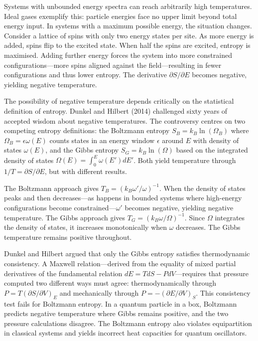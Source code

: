 Systems with unbounded energy spectra can reach arbitrarily high temperatures. Ideal gases exemplify this: particle energies face no upper limit beyond total energy input. In systems with a maximum possible energy, the situation changes. Consider a lattice of spins with only two energy states per site. As more energy is added, spins flip to the excited state. When half the spins are excited, entropy is maximised. Adding further energy forces the system into more constrained configurations—more spins aligned against the field—resulting in fewer configurations and thus lower entropy. The derivative $ \partial S/\partial E $ becomes negative, yielding negative temperature.

The possibility of negative temperature depends critically on the statistical definition of entropy. Dunkel and Hilbert (2014) challenged sixty years of accepted wisdom about negative temperatures. The controversy centres on two competing entropy definitions: the Boltzmann entropy $S_B = k_B \ln(\Omega_B)$ where $\Omega_B = \epsilon \omega(E)$ counts states in an energy window $\epsilon$ around $E$ with density of states $\omega(E)$, and the Gibbs entropy $S_G = k_B \ln(\Omega)$ based on the integrated density of states $\Omega(E) = \int_0^E \omega(E') dE'$. Both yield temperature through $1/T = \partial S/\partial E$, but with different results.

The Boltzmann approach gives $T_B = (k_B \omega'/\omega)^{-1}$. When the density of states peaks and then decreases—as happens in bounded systems where high-energy configurations become constrained—$\omega'$ becomes negative, yielding negative temperature. The Gibbs approach gives $T_G = (k_B \omega/\Omega)^{-1}$. Since $\Omega$ integrates the density of states, it increases monotonically when $\omega$ decreases. The Gibbs temperature remains positive throughout.

Dunkel and Hilbert argued that only the Gibbs entropy satisfies thermodynamic consistency. A Maxwell relation—derived from the equality of mixed partial derivatives of the fundamental relation $dE = TdS - PdV$—requires that pressure computed two different ways must agree: thermodynamically through $P = T(\partial S/\partial V)_E$ and mechanically through $P = - (\partial E/\partial V)_S$. This consistency test fails for Boltzmann entropy. In a quantum particle in a box, Boltzmann predicts negative temperature where Gibbs remains positive, and the two pressure calculations disagree. The Boltzmann entropy also violates equipartition in classical systems and yields incorrect heat capacities for quantum oscillators.

